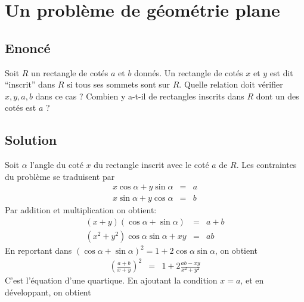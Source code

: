 \documentclass{article}
\newenvironment{statement}{\subsection{Enoncé}}{\pagebreak}
\newenvironment{solution}{\subsection{Solution}}{\pagebreak}
\begin{document}
\section{Un problème de géométrie plane}
\begin{statement}
Soit $R$ un rectangle de cotés $a$ et $b$ donnés. Un rectangle de cotés $x$ et $y$ est dit ``inscrit'' dans $R$ si tous ses sommets sont sur $R$. Quelle relation doit vérifier $x,y,a,b$ dans ce cas ? Combien y a-t-il de rectangles inscrits dans $R$ dont un des cotés est $a$ ?
\end{statement}
\begin{solution}
\begin{center}
\end{center}
Soit $\alpha$ l'angle du coté $x$ du rectangle inscrit avec le coté $a$ de $R$. Les contraintes du problème se traduisent par
\begin{eqnarray*}
x\cos\alpha+y\sin\alpha & = & a\\
x\sin\alpha+y\cos\alpha & = & b
\end{eqnarray*}
Par addition et multiplication on obtient:
\begin{eqnarray*}
(x+y)(\cos\alpha+\sin\alpha) & = & a+b\\
(x^2+y^2)\cos\alpha\sin\alpha+xy & = & ab
\end{eqnarray*}
En reportant dans $(\cos\alpha+\sin\alpha)^2=1+2\cos\alpha\sin\alpha$, on obtient
\begin{eqnarray*}
\left(\frac{a+b}{x+y}\right)^2 & = & 1+2\frac{ab-xy}{x^2+y^2}
\end{eqnarray*}
C'est l'équation d'une quartique. En ajoutant la condition $x=a$, et en développant, on obtient

\end{solution}
\end{document}
